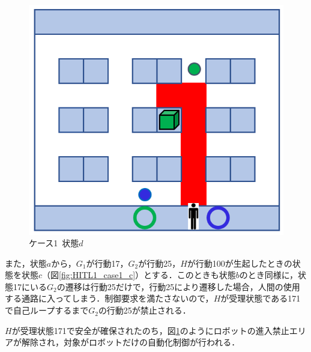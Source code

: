 \begin{figure}[!t]
    \centering
    \includegraphics[scale=0.32]{figures/HITL1_case1_d.png}
    \caption{ケース1\ 状態$d$}
    \label{fig:HITL1_case1_d}
\end{figure}

また，状態$a$から，$G_1$が行動17，$G_2$が行動25，$H$が行動100が生起したときの状態を状態$c$（図\ref{fig:HITL1_case1_c}）とする．このときも状態$b$のとき同様に，状態17にいる$G_2$の遷移は行動25だけで，行動25により遷移した場合，人間の使用する通路に入ってしまう．制御要求を満たさないので，$H$が受理状態である171で自己ループするまで$G_2$の行動25が禁止される．

$H$が受理状態171で安全が確保されたのち，図\ref{fig:HITL1_case1_d}のようにロボットの進入禁止エリアが解除され，対象がロボットだけの自動化制御が行われる．

